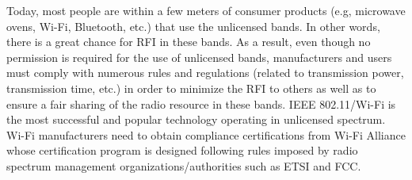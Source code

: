 Today, most people are within a few meters of consumer products (e.g, microwave ovens, Wi-Fi, Bluetooth, etc.) that use the unlicensed bands. In other words, there is a great chance for RFI in these bands. As a result, even though no permission is required for the use of unlicensed bands, manufacturers and users must comply with numerous rules and regulations (related to transmission power, transmission time, etc.) in order to minimize the RFI to others as well as to ensure a fair sharing of the radio resource in these bands. IEEE 802.11/Wi-Fi is the most successful and popular technology operating in unlicensed spectrum. Wi-Fi manufacturers need to obtain compliance certifications from Wi-Fi Alliance whose certification program is designed following rules imposed by radio spectrum management organizations/authorities such as ETSI and FCC. 

